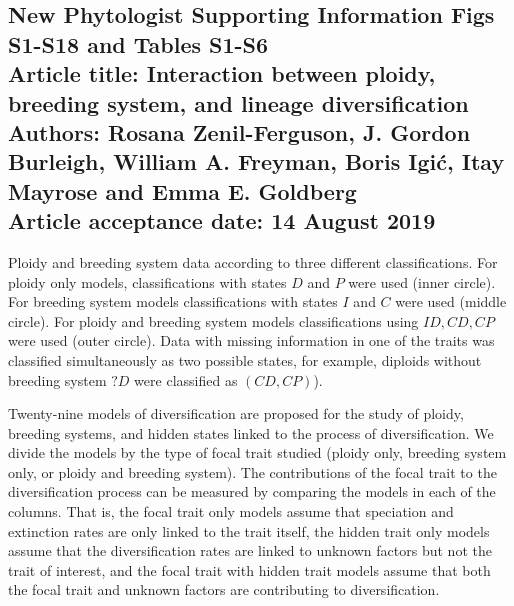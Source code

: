 \subsection*{New Phytologist Supporting Information Figs S1-S18 and Tables S1-S6\\
Article title: Interaction between ploidy, breeding system, and lineage diversification\\
Authors: Rosana Zenil-Ferguson, J. Gordon Burleigh, William A. Freyman, Boris Igi\'c, Itay Mayrose and Emma E. Goldberg\\
Article acceptance date: 14 August 2019}

\begin{suppfigure}
    \caption{Ploidy and breeding system data according to three different classifications. For ploidy only models, classifications with states $D$ and $P$ were used (inner circle). For breeding system models classifications with states $I$ and $C$ were used (middle circle). For ploidy and breeding system models classifications using $ID, CD, CP$ were used (outer circle). Data with missing information in one of the traits was classified simultaneously as two possible states, for example, diploids without breeding system $?D$ were classified as $(CD, CP)$).}
    \label{fig:allmodels}
\end{suppfigure}





\begin{suppfigure} %
    \caption{ Twenty-nine models of diversification are proposed for the study of ploidy, breeding systems, and hidden states linked to the process of diversification. We divide the models by the type of focal trait studied (ploidy only, breeding system only, or ploidy and breeding system). The contributions of the focal trait to the diversification process can be measured by comparing the models in each of the columns. That is, the focal trait only models assume that speciation and extinction rates are only linked to the trait itself, the hidden trait only models assume that the diversification rates are  linked to unknown factors but not the trait of interest, and the focal trait with hidden trait models assume that both the focal trait and unknown factors are contributing to diversification.}
    \label{fig:allmodels}
\end{suppfigure}



